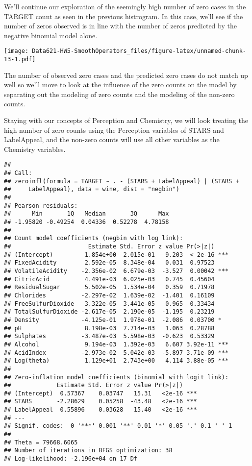 \documentclass[]{article}
\begin{document}
We'll continue our exploration of the seemingly high number of zero
cases in the TARGET count as seen in the previous histrogram. In this
case, we'll see if the number of zeros observed is in line with the
number of zeros predicted by the negative binomial model alone.

\texttt{[image: Data621-HW5-SmoothOperators\_files/figure-latex/unnamed-chunk-13-1.pdf]}

The number of observed zero cases and the predicted zero cases do not
match up well so we'll move to look at the influence of the zero counts
on the model by separating out the modeling of zero counts and the
modeling of the non-zero counts.

Staying with our concepts of Perception and Chemistry, we will look
treating the high number of zero counts using the Perception variables
of STARS and LabelAppeal, and the non-zero counts will use all other
variables as the Chemistry variables.

\begin{verbatim}
## 
## Call:
## zeroinfl(formula = TARGET ~ . - (STARS + LabelAppeal) | (STARS + 
##     LabelAppeal), data = wine, dist = "negbin")
## 
## Pearson residuals:
##      Min       1Q   Median       3Q      Max 
## -1.95820 -0.49254  0.04336  0.52278  4.78158 
## 
## Count model coefficients (negbin with log link):
##                      Estimate Std. Error z value Pr(>|z|)    
## (Intercept)         1.854e+00  2.015e-01   9.203  < 2e-16 ***
## FixedAcidity        2.592e-05  8.348e-04   0.031  0.97523    
## VolatileAcidity    -2.356e-02  6.679e-03  -3.527  0.00042 ***
## CitricAcid          4.491e-03  6.025e-03   0.745  0.45604    
## ResidualSugar       5.502e-05  1.534e-04   0.359  0.71978    
## Chlorides          -2.297e-02  1.639e-02  -1.401  0.16109    
## FreeSulfurDioxide   3.322e-05  3.441e-05   0.965  0.33434    
## TotalSulfurDioxide -2.617e-05  2.190e-05  -1.195  0.23219    
## Density            -4.125e-01  1.978e-01  -2.086  0.03700 *  
## pH                  8.198e-03  7.714e-03   1.063  0.28788    
## Sulphates          -3.487e-03  5.598e-03  -0.623  0.53329    
## Alcohol             9.194e-03  1.392e-03   6.607 3.92e-11 ***
## AcidIndex          -2.973e-02  5.042e-03  -5.897 3.71e-09 ***
## Log(theta)          1.129e+01  2.743e+00   4.114 3.88e-05 ***
## 
## Zero-inflation model coefficients (binomial with logit link):
##             Estimate Std. Error z value Pr(>|z|)    
## (Intercept)  0.57367    0.03747   15.31   <2e-16 ***
## STARS       -2.28629    0.05258  -43.48   <2e-16 ***
## LabelAppeal  0.55896    0.03628   15.40   <2e-16 ***
## ---
## Signif. codes:  0 '***' 0.001 '**' 0.01 '*' 0.05 '.' 0.1 ' ' 1 
## 
## Theta = 79668.6065 
## Number of iterations in BFGS optimization: 38 
## Log-likelihood: -2.196e+04 on 17 Df
\end{verbatim}
\end{document}
